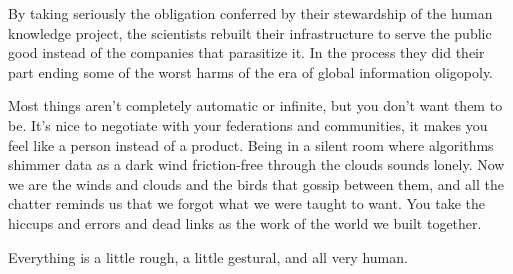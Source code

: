\documentclass[10pt]{article}
\begin{document}
\begin{multicols}{2}
By taking seriously the obligation conferred by their stewardship of the
human knowledge project, the scientists rebuilt their infrastructure to
serve the public good instead of the companies that parasitize it. In
the process they did their part ending some of the worst harms of the
era of global information oligopoly.

Most things aren't completely automatic or infinite, but you don't want
them to be. It's nice to negotiate with your federations and
communities, it makes you feel like a person instead of a product. Being
in a silent room where algorithms shimmer data as a dark wind
friction-free through the clouds sounds lonely. Now we are the winds and
clouds and the birds that gossip between them, and all the chatter
reminds us that we forgot what we were taught to want. You take the
hiccups and errors and dead links as the work of the world we built
together.

Everything is a little rough, a little gestural, and all very human.

\end{multicols}


 
\end{document}
